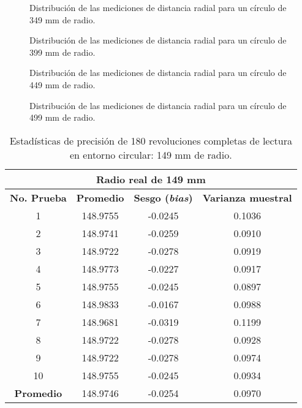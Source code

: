 \begin{figure}[H]
	\centering
	\caption{Distribución de las mediciones de distancia radial para un círculo de 349 mm de radio.}
	\label{fig:histograma_dists5}
\end{figure}

\begin{figure}[H]
	\centering
	\caption{Distribución de las mediciones de distancia radial para un círculo de 399 mm de radio.}
	\label{fig:histograma_dists6}
\end{figure}

\begin{figure}[H]
	\centering
	\caption{Distribución de las mediciones de distancia radial para un círculo de 449 mm de radio.}
	\label{fig:histograma_dists7}
\end{figure}

\begin{figure}[H]
	\centering
	\caption{Distribución de las mediciones de distancia radial para un círculo de 499 mm de radio.}
	\label{fig:histograma_dists8}
\end{figure}

\begin{table}[!ht]
	\centering
	\begin{tabular}{|c|c|c|c|}
		\hline
		\multicolumn{4}{|c|}{\textbf{Radio real de 149 mm}} \\ \hline
		\textbf{No. Prueba} & \textbf{Promedio} & \textbf{Sesgo (\textit{bias})} & \textbf{Varianza muestral} \\ \hline
		1 & 148.9755 & -0.0245 & 0.1036 \\ 
		2 & 148.9741 & -0.0259 & 0.0910 \\ 
		3 & 148.9722 & -0.0278 & 0.0919 \\ 
		4 & 148.9773 & -0.0227 & 0.0917 \\ 
		5 & 148.9755 & -0.0245 & 0.0897 \\ 
		6 & 148.9833 & -0.0167 & 0.0988 \\ 
		7 & 148.9681 & -0.0319 & 0.1199 \\ 
		8 & 148.9722 & -0.0278 & 0.0928 \\ 
		9 & 148.9722 & -0.0278 & 0.0974 \\
		10 & 148.9755 & -0.0245 & 0.0934 \\ \hline
		\textbf{Promedio} & 148.9746 & -0.0254 & 0.0970 \\ \hline
	\end{tabular}
	\caption{Estadísticas de precisión de 180 revoluciones completas de lectura en entorno circular: 149 mm de radio.}
	\label{fig:tabla_dists1}
\end{table}


